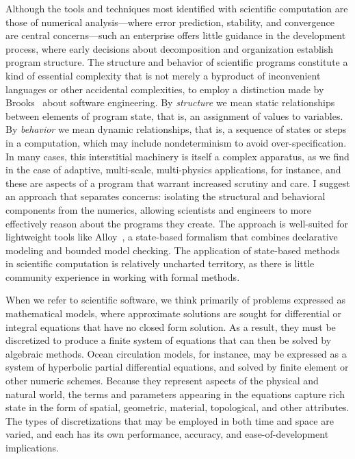\documentclass[../../proposal.tex]{subfiles}
\begin{document}
Although the tools and techniques most identified with scientific computation are those of numerical analysis---where error prediction, stability, and convergence are central concerns---such an enterprise offers little guidance in the development process, where early decisions about decomposition and organization establish program structure.  The structure and behavior of scientific programs constitute a kind of essential complexity that is not merely a byproduct of inconvenient languages or other accidental complexities, to employ a distinction made by Brooks~\cite{brooks} about software engineering.  By \emph{structure} we mean static relationships between elements of program state, that is, an assignment of values to variables.  By \emph{behavior} we mean dynamic relationships, that is, a sequence of states or steps in a computation, which may include nondeterminism to avoid over-specification. In many cases, this interstitial machinery is itself a complex apparatus, as we find in the case of adaptive, multi-scale, multi-physics applications, for instance, and these are aspects of a program that warrant increased scrutiny and care.  I suggest an approach that separates concerns: isolating the structural and behavioral components from the numerics, allowing scientists and engineers to more effectively reason about the programs they create.  The approach is well-suited for lightweight tools like Alloy~\cite{jackson2012}, a state-based formalism that combines declarative modeling and bounded model checking.  The application of state-based methods in scientific computation is relatively uncharted territory, as there is little community experience in working with formal methods.  

When we refer to scientific software, we think primarily of problems expressed as mathematical models, where approximate solutions are sought for differential or integral equations that have no closed form solution.  As a result, they must be discretized to produce a finite system of equations that can then be solved by algebraic methods.  Ocean circulation models, for instance, may be expressed as a system of hyperbolic partial differential equations, and solved by finite element or other numeric schemes.  Because they represent aspects of the physical and natural world, the terms and parameters appearing in the equations capture rich state in the form of spatial, geometric, material, topological, and other attributes.  The types of discretizations that may be employed in both time and space are varied, and each has its own performance, accuracy, and ease-of-development implications.
\end{document}
